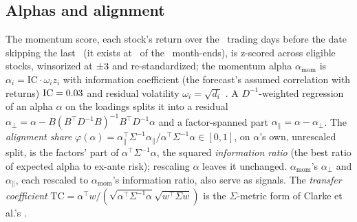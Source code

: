 \documentclass[conference]{IEEEtran}
\newcommand{\T}{^{\top}}
\begin{document}
\subsection{Alphas and alignment}
The momentum score, each stock's return over the \MomLookback\ trading days before the date skipping the last \MomSkip\ (it exists at \DisclosureDates\ of the \RiskMonthEnds\ month-ends), is z-scored across eligible stocks, winsorized at $\pm3$ and re-standardized; the momentum alpha $\alpha_{\mathrm{mom}}$ is $\alpha_i=\mathrm{IC}\cdot\omega_i z_i$ with information coefficient (the forecast's assumed correlation with returns) $\mathrm{IC}=0.03$ and residual volatility $\omega_i=\sqrt{d_i}$ \cite{grinold2000active}. A $D^{-1}$-weighted regression of an alpha $\alpha$ on the loadings splits it into a residual $\alpha_\perp=\alpha-B(B\T D^{-1}B)^{-1}B\T D^{-1}\alpha$ and a factor-spanned part $\alpha_\parallel=\alpha-\alpha_\perp$. The \emph{alignment share} $\varphi(\alpha)=\alpha_\parallel\T\Sigma^{-1}\alpha_\parallel/\alpha\T\Sigma^{-1}\alpha\in[0,1]$, on $\alpha$'s own, unrescaled split, is the factors' part of $\alpha\T\Sigma^{-1}\alpha$, the squared \emph{information ratio} (the best ratio of expected alpha to ex-ante risk); rescaling $\alpha$ leaves it unchanged. $\alpha_{\mathrm{mom}}$'s $\alpha_\perp$ and $\alpha_\parallel$, each rescaled to $\alpha_{\mathrm{mom}}$'s information ratio, also serve as signals. The \emph{transfer coefficient} $\mathrm{TC}=\alpha\T w/(\sqrt{\alpha\T\Sigma^{-1}\alpha}\sqrt{w\T\Sigma w})$ is the $\Sigma$-metric form of Clarke et al.'s \cite{clarke2002portfolio}.

\end{document}
